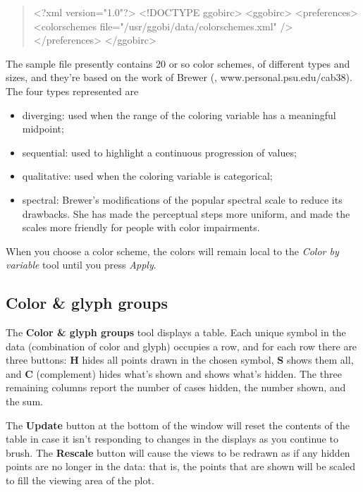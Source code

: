 \documentclass[11pt]{article}
\begin{document}
\begin{quote}
<?xml version="1.0"?>
<!DOCTYPE ggobirc>
<ggobirc>
<preferences>
  <colorschemes file="/usr/ggobi/data/colorschemes.xml" />
</preferences>
</ggobirc>
\end{quote}

The sample file presently contains 20 or so color schemes, of
different types and sizes, and they're based on the work of
Brewer (\cite{Brewer99}, www.personal.psu.edu/cab38).
The four types represented are

\begin{itemize}
\item diverging: used when the range of the coloring variable has
      a meaningful midpoint;
\item sequential: used to highlight a continuous progression of values;
\item qualitative: used when the coloring variable is categorical;
\item spectral: Brewer's modifications of the popular spectral scale
      to reduce its drawbacks.  She has made the perceptual steps
      more uniform, and made the scales more friendly for people with
      color impairments.
\end{itemize}

When you choose a color scheme, the colors will remain local to
the  {\em Color by variable} tool until you press {\em Apply}.

\subsection{Color \& glyph groups}
\label{slbl:ColorAndGlyphGroups}

The {\bf Color \& glyph groups} tool displays a table.  Each unique
symbol in the data (combination of color and glyph) occupies a row,
and for each row there are three buttons:  {\bf H} hides all points
drawn in the chosen symbol, {\bf S} shows them all, and {\bf C} 
(complement) hides
what's shown and shows what's hidden.  The three remaining columns
report the number of cases hidden, the number shown, and the sum.

The {\bf Update} button at the bottom of the window will reset the
contents of the table in case it isn't responding to changes in the
displays as you continue to brush.  The {\bf Rescale} button will cause
the views to be redrawn as if any hidden points are no longer in the
data:  that is, the points that are shown will be scaled to fill the
viewing area of the plot.
\end{document}

